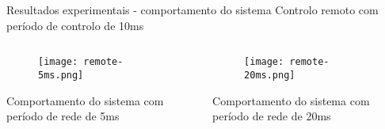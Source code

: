 \begin{frame}{Resultados experimentais - comportamento do sistema}
	\centering
	\large
	Controlo remoto com per\'{i}odo de controlo de 10ms
	\begin{columns}
		\begin{column}{0.5\textwidth}
			\begin{figure}
				\centering
				\texttt{[image: remote-5ms.png]}
			\end{figure}
			\centering\normalsize
			Comportamento do sistema com per\'{i}odo de rede de 5ms
		\end{column}
		\begin{column}{0.5\textwidth}
			\begin{figure}
				\centering
				\texttt{[image: remote-20ms.png]}
			\end{figure}
			\centering\normalsize
			Comportamento do sistema com per\'{i}odo de rede de 20ms
		\end{column}
	\end{columns}
\end{frame}